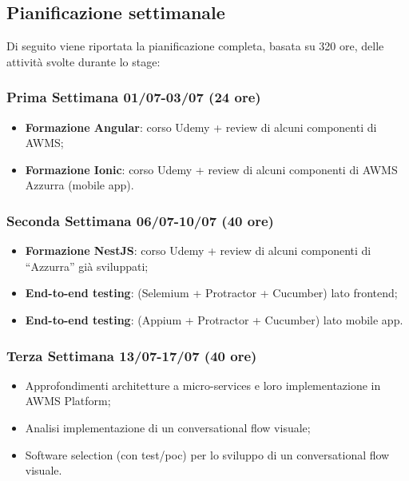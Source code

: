 \subsection{Pianificazione settimanale}
Di seguito viene riportata la pianificazione completa, basata su 320 ore, delle attività svolte durante lo stage:
\begin{trivlist}
	\item \subsubsection{Prima Settimana 01/07-03/07 (24 ore)}   
	\begin{itemize}
		\item \textbf{Formazione Angular}: corso Udemy + review di alcuni componenti di \gls{AWMS}\ap{[g]};
		\item \textbf{Formazione Ionic}: corso Udemy + review di alcuni componenti di \gls{AWMS}\ap{[g]} Azzurra (mobile app).
	\end{itemize}  

\item \subsubsection{Seconda Settimana 06/07-10/07 (40 ore)}
\begin{itemize}
	\item \textbf{Formazione NestJS}: corso Udemy + review di alcuni componenti di “Azzurra” già sviluppati;
	\item \textbf{End-to-end testing}: (Selemium + Protractor + Cucumber) lato frontend;
	\item \textbf{End-to-end testing}: (Appium + Protractor + Cucumber) lato mobile app.
\end{itemize}

\item \subsubsection{Terza Settimana 13/07-17/07 (40 ore)}
\begin{itemize}
	\item Approfondimenti architetture a micro-services e loro implementazione in \gls{AWMS}\ap{[g]} Platform;
	\item Analisi implementazione di un conversational flow visuale;
	\item Software selection (con test/poc) per lo sviluppo di un conversational flow visuale.
\end{itemize}	


\end{trivlist}
